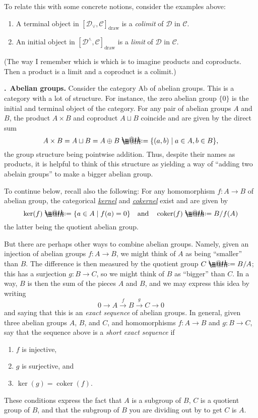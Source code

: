 \documentclass[11pt, noamsfonts]{amsart}
\makeatletter
\newcommand{\pointheader}{\vspace{2mm}\noindent\refstepcounter{section}\textbf{\thesection.}}
\newcommand{\bpoint}[1]{\pointheader~{\bf #1.}}
\newcommand*{\coloneqq}{\mathrel{\rlap{%
           \raisebox{0.3ex}{$\m@th\cdot$}}%
           \raisebox{-0.3ex}{$\m@th\cdot$}}%
           =}
\makeatother
\begin{document}
To relate this with some concrete notions, consider the examples above:
\begin{enumerate}
\item A terminal object in \([\mathcal{D}_\vee,\mathcal{C}]_{\mathrm{draw}}\)
is a \emph{colimit} of \(\mathcal{D}\) in \(\mathcal{C}\).
\item An initial object in \([\mathcal{D}^\wedge,\mathcal{C}]_{\mathrm{draw}}\)
is a \emph{limit} of \(\mathcal{D}\) in \(\mathcal{C}\).
\end{enumerate}
(The way I remember which is which is to imagine products and coproducts. Then
a product is a limit and a coproduct is a colimit.)

\bpoint{Abelian groups}
Consider the category \(\mathrm{Ab}\) of abelian groups. This is a category with
a lot of structure. For instance, the zero abelian group \(\{0\}\) is the initial
and terminal object of the category. For any pair of abelian groups \(A\) and
\(B\), the product \(A \times B\) and coproduct \(A \sqcup B\) coincide and
are given by the direct sum
\[ A \times B = A \sqcup B = A \oplus B \coloneqq \{(a,b) \mid a \in A, b \in B\}, \]
the group structure being pointwise addition. Thus, despite their names as
products, it is helpful to think of this structure as yielding a way of ``adding
two abelain groups'' to make a bigger abelian group.

To continue below, recall also the following: For any homomorphism
\(f \colon A \to B\) of abelian group, the categorical
\href{https://en.wikipedia.org/wiki/Kernel_(category_theory)}{\emph{kernel}} and
\href{https://en.wikipedia.org/wiki/Cokernel}{\emph{cokernel}} exist
and are given by
\[
\ker(f) \coloneqq \{a \in A \mid f(a) = 0\}
\quad\text{and}\quad
\operatorname{coker}(f) \coloneqq B/f(A)
\]
the latter being the quotient abelian group.

But there are perhaps other ways to combine abelian groups. Namely, given an
injection of abelian groups \(f \colon A \to B\), we might think of \(A\) as being ``smaller''
than \(B\). The difference is then measured by the quotient group \(C \coloneqq B/A\);
this has a surjection \(g \colon B \to C\), so we might think of \(B\) as ``bigger'' than \(C\).
In a way, \(B\) is then the sum of the pieces \(A\) and \(B\), and we may express
this idea by writing
\[ 0 \to A \xrightarrow{f} B \xrightarrow{g} C \to 0 \]
and saying that this is an \emph{exact sequence} of abelian groups. In general,
given three abelian groups \(A\), \(B\), and \(C\), and homomorphisms \(f \colon A \to B\)
and \(g \colon B \to C\), say that the sequence above is a \emph{short exact sequence}
if
\begin{enumerate}
\item \(f\) is injective,
\item \(g\) is surjective, and
\item \(\ker(g) = \operatorname{coker}(f)\).
\end{enumerate}
These conditions express the fact that \(A\) is a subgroup of \(B\), \(C\) is a
quotient group of \(B\), and that the subgroup of \(B\) you are dividing out by
to get \(C\) is \(A\).
\end{document}
